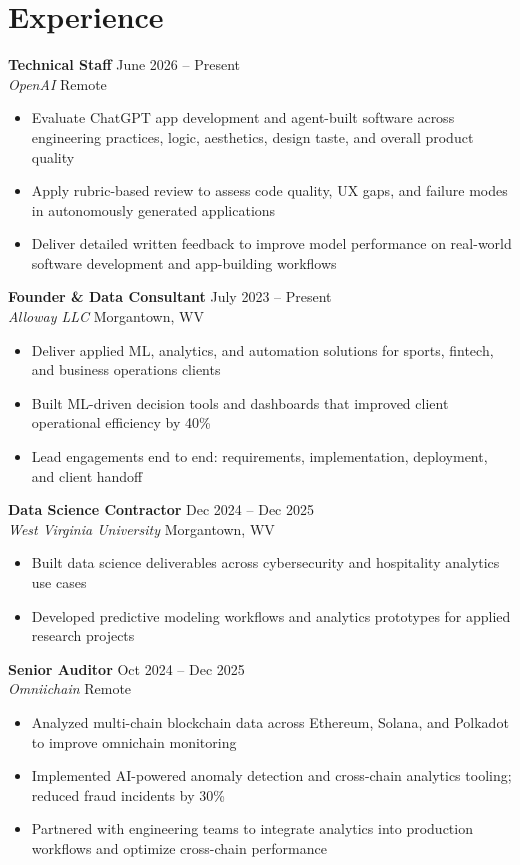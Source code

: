 \documentclass[11pt,letterpaper]{article}
\newcommand{\resumeitem}[1]{\item[\textbullet] #1}
\begin{document}
\section{Experience}

\textbf{Technical Staff} \hfill June 2026 -- Present \\
\textit{OpenAI} \hfill Remote
\begin{itemize}[nosep, leftmargin=16pt, topsep=2pt]
    \resumeitem{Evaluate ChatGPT app development and agent-built software across engineering practices, logic, aesthetics, design taste, and overall product quality}
    \resumeitem{Apply rubric-based review to assess code quality, UX gaps, and failure modes in autonomously generated applications}
    \resumeitem{Deliver detailed written feedback to improve model performance on real-world software development and app-building workflows}
\end{itemize}

\vspace{4pt}

\textbf{Founder \& Data Consultant} \hfill July 2023 -- Present \\
\textit{Alloway LLC} \hfill Morgantown, WV
\begin{itemize}[nosep, leftmargin=16pt, topsep=2pt]
    \resumeitem{Deliver applied ML, analytics, and automation solutions for sports, fintech, and business operations clients}
    \resumeitem{Built ML-driven decision tools and dashboards that improved client operational efficiency by 40\%}
    \resumeitem{Lead engagements end to end: requirements, implementation, deployment, and client handoff}
\end{itemize}

\vspace{4pt}

\textbf{Data Science Contractor} \hfill Dec 2024 -- Dec 2025 \\
\textit{West Virginia University} \hfill Morgantown, WV
\begin{itemize}[nosep, leftmargin=16pt, topsep=2pt]
    \resumeitem{Built data science deliverables across cybersecurity and hospitality analytics use cases}
    \resumeitem{Developed predictive modeling workflows and analytics prototypes for applied research projects}
\end{itemize}

\vspace{4pt}

\textbf{Senior Auditor} \hfill Oct 2024 -- Dec 2025 \\
\textit{Omniichain} \hfill Remote
\begin{itemize}[nosep, leftmargin=16pt, topsep=2pt]
    \resumeitem{Analyzed multi-chain blockchain data across Ethereum, Solana, and Polkadot to improve omnichain monitoring}
    \resumeitem{Implemented AI-powered anomaly detection and cross-chain analytics tooling; reduced fraud incidents by 30\%}
    \resumeitem{Partnered with engineering teams to integrate analytics into production workflows and optimize cross-chain performance}
\end{itemize}
\end{document}
